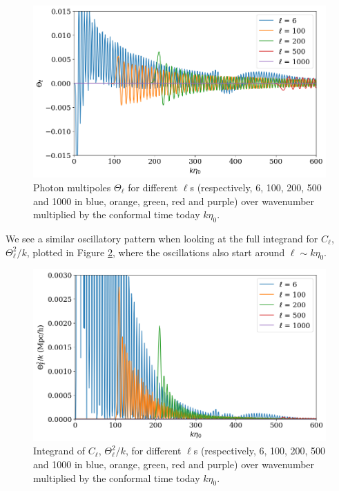 \documentclass{aa}
\begin{document}
\begin{figure}[ht]
    \centering
    \includegraphics[width=\linewidth]{report/figures/theta_ell_of_k.png}
    \caption{Photon multipoles $\Theta_\ell$ for different $\ell$s (respectively, 6, 100, 200, 500 and 1000 in blue, orange, green, red and purple) over wavenumber multiplied by the conformal time today $k\eta_0$.}
    \label{fig:thetaell}
\end{figure}

We see a similar oscillatory pattern when looking at the full integrand for $C_\ell$, $\Theta_\ell^2/k$, plotted in Figure \ref{fig:integrand}, where the oscillations also start around $\ell\sim k\eta_0$.

\begin{figure}[ht]
    \centering
    \includegraphics[width=\linewidth]{report/figures/theta_ell2_of_k.png}
    \caption{Integrand of $C_\ell$, $\Theta_\ell^2/k$, for different $\ell$s (respectively, 6, 100, 200, 500 and 1000 in blue, orange, green, red and purple) over wavenumber multiplied by the conformal time today $k\eta_0$.}
    \label{fig:integrand}
\end{figure}
\end{document}
